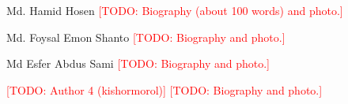 \documentclass{ieeeaccess}
\newcommand{\TODO}[1]{\textcolor{red}{[TODO: #1]}}
\begin{document}



\begin{IEEEbiographynophoto}{Md. Hamid Hosen}
\TODO{Biography (about 100 words) and photo.}
\end{IEEEbiographynophoto}

\begin{IEEEbiographynophoto}{Md. Foysal Emon Shanto}
\TODO{Biography and photo.}
\end{IEEEbiographynophoto}

\begin{IEEEbiographynophoto}{Md Esfer Abdus Sami}
\TODO{Biography and photo.}
\end{IEEEbiographynophoto}

\begin{IEEEbiographynophoto}{\TODO{Author 4 (kishormorol)}}
\TODO{Biography and photo.}
\end{IEEEbiographynophoto}

\EOD
\end{document}
